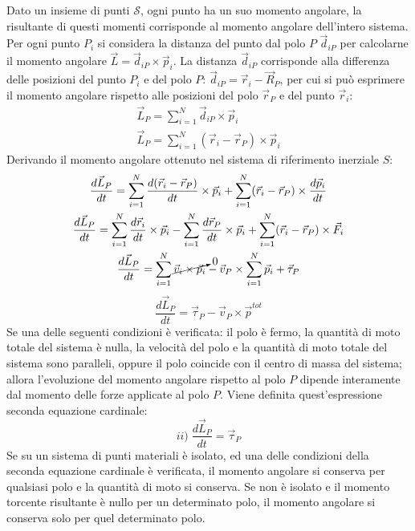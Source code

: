 \documentclass{article}
\numberwithin{equation}{subsection}
\begin{document}
Dato un insieme di punti $\mathscr{S}$, ogni punto ha un suo momento angolare, la risultante di questi momenti corrisponde al momento angolare dell'intero sistema. 
Per ogni punto $P_i$ si considera la distanza del punto dal polo $P$ $\vec{d}_{iP}$ per calcolarne il momento angolare $\vec{L}=\vec{d}_{iP}\times\vec{p}_i$. La distanza $\vec{d}_{iP}$ 
corrisponde alla differenza delle posizioni del punto $P_i$ e del polo $P$: $\vec{d}_{iP}=\vec{r}_i-\vec{R}_P$, per cui si può esprimere il momento angolare rispetto alle 
posizioni del polo $\vec{r}_P$ e del punto $\vec{r}_i$: 
\begin{gather*}
    \vec{L}_P=\displaystyle\sum_{i=1}^{N}\vec{d}_{iP}\times\vec{p}_i\\
    \vec{L}_P=\displaystyle\sum_{i=1}^N(\vec{r}_i-\vec{r}_P)\times\vec{p}_i
\end{gather*}
Derivando il momento angolare ottenuto nel sistema di riferimento inerziale $S$: 
\begin{gather*}
    \displaystyle\frac{d\vec{L}_P}{dt}=\sum_{i=1}^N\frac{d(\vec{r}_i-\vec{r}_P)}{dt}\times\vec{p}_i+\sum_{i=1}^N(\vec{r}_i-\vec{r}_P)\times\frac{d\vec{p}_i}{dt}\\
    \displaystyle\frac{d\vec{L}_P}{dt}=\sum_{i=1}^N\frac{d\vec{r}_i}{dt}\times\vec{p}_i-\sum_{i=1}^N\frac{d\vec{r}_P}{dt}\times\vec{p}_i+\sum_{i=1}^N(\vec{r}_i-\vec{r}_P)\times\vec{F}_i\\
    \displaystyle\frac{d\vec{L}_P}{dt}=\sum_{i=1}^N\cancelto{0}{\vec{v}_i\times\vec{p}_i}-\vec{v}_P\times\sum_{i=1}^N\vec{p}_i+\vec{\tau}_P\\
\end{gather*}
\begin{equation}
    \displaystyle\frac{d\vec{L}_P}{dt}=\vec{\tau}_P-\vec{v}_P\times\vec{p}^{tot}
\end{equation}
Se una delle seguenti condizioni è verificata: il polo è fermo, la quantità di moto totale del sistema è 
nulla, la velocità del polo e la quantità di moto 
totale del sistema sono paralleli, oppure il polo coincide con 
il centro di massa del sistema; allora l'evoluzione del momento angolare rispetto al polo $P$ dipende interamente dal momento delle forze applicate al polo $P$. Viene 
definita quest'espressione seconda equazione cardinale:  
\begin{equation*}
    ii)\;\displaystyle\frac{d\vec{L}_P}{dt}=\vec{\tau}_P
\end{equation*}
Se su un sistema di punti materiali è isolato, ed una delle condizioni della seconda equazione cardinale è verificata, il momento angolare si conserva per qualsiasi polo e la 
quantità di moto si conserva. Se non è isolato e il momento torcente risultante è nullo per un determinato polo, il momento angolare si conserva solo per quel determinato 
polo. 
\end{document}
